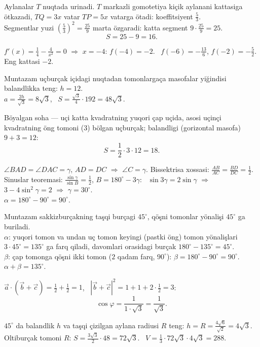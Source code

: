 Aylanalar $T$ nuqtada urinadi. $T$ markazli gomotetiya kiçik aylanani kattasiga ötkazadi, $TQ=3x$ vatar $TP=5x$ vatarga ötadi: koeffitsiyent $\frac53$.\\
Segmentlar yuzi $\left(\frac53\right)^2=\frac{25}9$ marta özgaradi: katta segment $9\cdot\frac{25}9=25$.
\[S=25-9=16.\]

$f'(x)=\frac14-\frac4{x^2}=0$ $\Rightarrow$ $x=-4$: $f(-4)=-2$. \ $f(-6)=-\frac{13}6$, $f(-2)=-\frac52$. Eng kattasi $-2$.

Muntazam uçburçak içidagi nuqtadan tomonlargaça masofalar yiğindisi balandlikka teng: $h=12$.\\
$a=\frac{2h}{\sqrt3}=8\sqrt3$, \ $S=\frac{\sqrt3}4\cdot192=48\sqrt3$.

Böyalgan soha — uçi katta kvadratning yuqori çap uçida, asosi uçinçi kvadratning öng tomoni ($3$) bölgan uçburçak; balandligi (gorizontal masofa) $9+3=12$:
\[S=\frac12\cdot3\cdot12=18.\]

$\angle BAD=\angle DAC=\gamma$, $AD=DC$ $\Rightarrow$ $\angle C=\gamma$. Bissektrisa xossasi: $\frac{AB}{AC}=\frac{BD}{DC}=\frac12$.\\
Sinuslar teoremasi: $\frac{\sin\gamma}{\sin B}=\frac12$, $B=180^\circ-3\gamma$: \ $\sin3\gamma=2\sin\gamma$ $\Rightarrow$ $3-4\sin^2\gamma=2$ $\Rightarrow$ $\gamma=30^\circ$.\\
$\alpha=180^\circ-90^\circ=90^\circ$.

Muntazam sakkizburçakning taşqi burçagi $45^\circ$, qöşni tomonlar yönalişi $45^\circ$ ga buriladi.\\
$\alpha$: yuqori tomon va undan uç tomon keyingi (pastki öng) tomon yönalişlari $3\cdot45^\circ=135^\circ$ ga farq qiladi, davomlari orasidagi burçak $180^\circ-135^\circ=45^\circ$.\\
$\beta$: çap tomonga qöşni ikki tomon ($2$ qadam farq, $90^\circ$): $\beta=180^\circ-90^\circ=90^\circ$.\\
$\alpha+\beta=135^\circ$.

$\vec a\cdot(\vec b+\vec c)=\frac12+\frac12=1$, \ $|\vec b+\vec c|^2=1+1+2\cdot\frac12=3$:
\[\cos\varphi=\frac1{1\cdot\sqrt3}=\frac1{\sqrt3}.\]

$45^\circ$ da balandlik $h$ va taşqi çizilgan aylana radiusi $R$ teng: $h=R=\frac{4\sqrt6}{\sqrt2}=4\sqrt3$.\\
Oltiburçak tomoni $R$: $S=\frac{3\sqrt3}2\cdot48=72\sqrt3$. \ $V=\frac13\cdot72\sqrt3\cdot4\sqrt3=288$.

